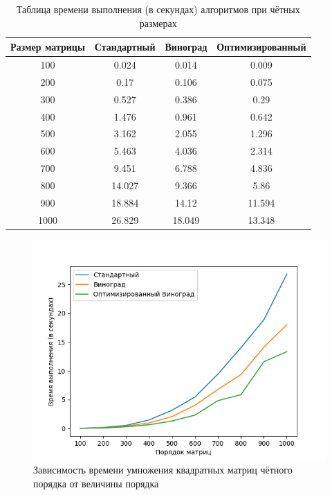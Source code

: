 \documentclass[12pt]{report}
\begin{document}
\begin{table} [H]
	\label{timeEven}
	\caption{Таблица времени выполнения (в секундах) алгоритмов при чётных размерах}
	\begin{center}
		\begin{tabular}{|c c c c|} 
			\hline
			Размер матрицы & Стандартный & Виноград & Оптимизированный \\  
			\hline
			100 & 0.024 & 0.014 & 0.009 \\
			\hline
			200 & 0.17 & 0.106 & 0.075 \\
			\hline
			300 & 0.527 & 0.386 & 0.29 \\
			\hline
			400 & 1.476 & 0.961 & 0.642 \\
			\hline
			500 & 3.162 & 2.055 & 1.296 \\
			\hline
			600 & 5.463 & 4.036 & 2.314 \\
			\hline
			700 & 9.451 & 6.788 & 4.836 \\
			\hline
			800 & 14.027 & 9.366 & 5.86 \\
			\hline
			900 & 18.884 & 14.12 & 11.594 \\
			\hline
			1000 & 26.829 & 18.049 & 13.348 \\
			\hline
		\end{tabular}
	\end{center}
\end{table}

\begin{figure}[H]
	\centering
	\includegraphics[scale=0.8]{even.png}
	\caption{Зависимость времени умножения квадратных матриц чётного порядка от величины порядка}
	\label{evenGraph}
\end{figure}
\end{document}
